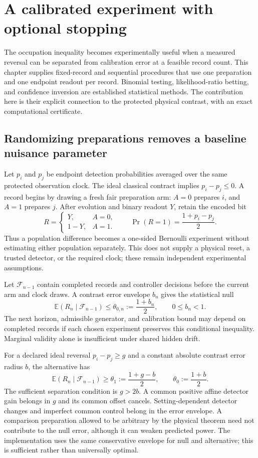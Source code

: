 \chapter{A calibrated experiment with optional stopping}
\label{rr:statistics}

The occupation inequality becomes experimentally useful when a measured
reversal can be separated from calibration error at a feasible record
count. This chapter supplies fixed-record and sequential procedures that
use one preparation and one endpoint readout per record. Binomial testing,
likelihood-ratio betting, and confidence inversion are established
statistical methods. The contribution here is their explicit connection
to the protected physical contrast, with an exact computational certificate.

\section{Randomizing preparations removes a baseline nuisance parameter}
Let $p_i$ and $p_j$ be endpoint detection probabilities averaged over the
same protected observation clock. The ideal classical contract implies
$p_i-p_j\leq0$. A record begins by drawing a fresh fair preparation arm:
$A=0$ prepares $i$, and $A=1$ prepares $j$. After evolution and binary
readout $Y$, retain the encoded bit
\[
 R=\begin{cases}Y,&A=0,\\1-Y,&A=1.\end{cases}
 \qquad \Pr(R=1)=\frac{1+p_i-p_j}{2}.
\]
Thus a population difference becomes a one-sided Bernoulli experiment
without estimating either population separately. This does not supply a
physical reset, a trusted detector, or the required clock; these remain
independent experimental assumptions.

Let $\mathcal F_{n-1}$ contain completed records and controller decisions
before the current arm and clock draws. A contrast error envelope $b_n$
gives the statistical null
\begin{equation}\label{rr:conditional-null}
 \mathbb E(R_n\mid\mathcal F_{n-1})
 \leq\theta_{0,n}:=\frac{1+b_n}{2},\qquad 0\leq b_n<1.
\end{equation}
The next horizon, admissible generator, and calibration bound may depend
on completed records if each chosen experiment preserves this conditional
inequality. Marginal validity alone is insufficient under shared hidden
drift.

For a declared ideal reversal $p_i-p_j\geq g$ and a constant absolute
contrast error radius $b$, the alternative has
\[
 \mathbb E(R_n\mid\mathcal F_{n-1})\geq
 \theta_1:=\frac{1+g-b}{2},\qquad
 \theta_0:=\frac{1+b}{2}.
\]
The sufficient separation condition is $g>2b$. A common positive affine
detector gain belongs in $g$ and its common offset cancels. Setting-dependent
detector changes and imperfect common control belong in the error envelope.
A comparison preparation allowed to be arbitrary by the physical theorem
need not contribute to the null error, although it can weaken predicted
power. The implementation uses the same conservative envelope for null
and alternative; this is sufficient rather than universally optimal.

